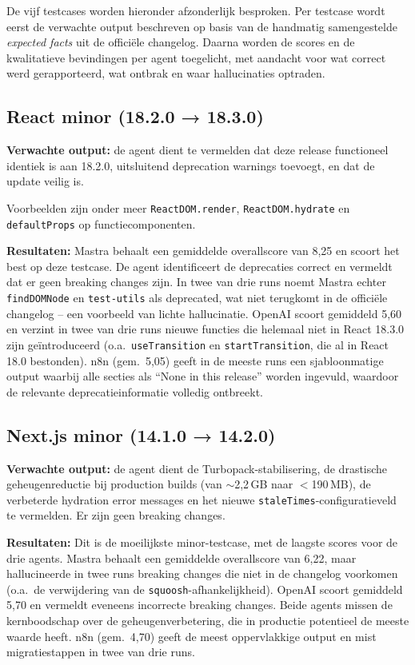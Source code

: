 De vijf testcases worden hieronder afzonderlijk besproken. Per testcase wordt eerst de verwachte output beschreven op basis van de handmatig samengestelde \textit{expected facts} uit de officiële changelog. Daarna worden de scores en de kwalitatieve bevindingen per agent toegelicht, met aandacht voor wat correct werd gerapporteerd, wat ontbrak en waar hallucinaties optraden.

\subsection{React minor (18.2.0 → 18.3.0)}
\label{subsec:tc-react}
 
\textbf{Verwachte output:} de agent dient te vermelden dat deze release functioneel identiek is aan 18.2.0, uitsluitend deprecation warnings toevoegt, en dat de update veilig is.

Voorbeelden zijn onder meer \texttt{ReactDOM.render}, \texttt{ReactDOM.hydrate} en \texttt{defaultProps} op functiecomponenten.

\textbf{Resultaten:} Mastra behaalt een gemiddelde overallscore van 8,25 en scoort het best op deze testcase. De agent identificeert de deprecaties correct en vermeldt dat er geen breaking changes zijn. In twee van drie runs noemt Mastra echter \texttt{findDOMNode} en \texttt{test-utils} als deprecated, wat niet terugkomt in de officiële changelog -- een voorbeeld van lichte hallucinatie. OpenAI scoort gemiddeld 5,60 en verzint in twee van drie runs nieuwe functies die helemaal niet in React 18.3.0 zijn geïntroduceerd (o.a.\ \texttt{useTransition} en \texttt{startTransition}, die al in React 18.0 bestonden). n8n (gem.\ 5,05) geeft in de meeste runs een sjabloonmatige output waarbij alle secties als ``None in this release'' worden ingevuld, waardoor de relevante deprecatieinformatie volledig ontbreekt.

\subsection{Next.js minor (14.1.0 → 14.2.0)}
\label{subsec:tc-nextjs}
 
\textbf{Verwachte output:} de agent dient de Turbopack-stabilisering, de drastische geheugenreductie bij production builds (van $\sim$2,2\,GB naar $<$190\,MB), de verbeterde hydration error messages en het nieuwe \texttt{staleTimes}-configuratieveld te vermelden. Er zijn geen breaking changes.
 
\textbf{Resultaten:} Dit is de moeilijkste minor-testcase, met de laagste scores voor de drie agents. Mastra behaalt een gemiddelde overallscore van 6,22, maar hallucineerde in twee runs breaking changes die niet in de changelog voorkomen (o.a.\ de verwijdering van de \texttt{squoosh}-afhankelijkheid). OpenAI scoort gemiddeld 5,70 en vermeldt eveneens incorrecte breaking changes. Beide agents missen de kernboodschap over de geheugenverbetering, die in productie potentieel de meeste waarde heeft. n8n (gem.\ 4,70) geeft de meest oppervlakkige output en mist migratiestappen in twee van drie runs.

